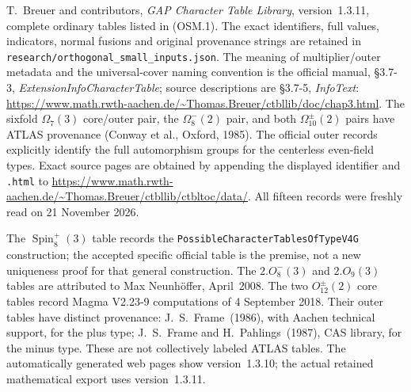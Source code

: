 T.~Breuer and contributors, \emph{GAP Character Table Library},
version~1.3.11, complete ordinary tables listed in (OSM.1).
The exact identifiers, full values, indicators, normal fusions and
original provenance strings are retained in
\texttt{research/orthogonal\_small\_inputs.json}.
The meaning of multiplier/outer metadata and the universal-cover
naming convention is the official manual, \S3.7-3,
\emph{ExtensionInfoCharacterTable}; source descriptions are \S3.7-5,
\emph{InfoText}:
\url{https://www.math.rwth-aachen.de/~Thomas.Breuer/ctbllib/doc/chap3.html}.
The sixfold $\Omega_7(3)$ core/outer pair, the $\Omega_8^-(2)$ pair,
and both $\Omega_{10}^{\pm}(2)$ pairs have ATLAS provenance
(Conway et al., Oxford, 1985). The official outer records explicitly
identify the full automorphism groups for the centerless even-field
types. Exact source pages are obtained by appending the displayed
identifier and \texttt{.html} to
\url{https://www.math.rwth-aachen.de/~Thomas.Breuer/ctbllib/ctbltoc/data/}.
All fifteen records were freshly read on 21 November 2026.

The $\operatorname{Spin}_8^+(3)$ table records the
\texttt{PossibleCharacterTablesOfTypeV4G} construction; the accepted
specific official table is the premise, not a new uniqueness proof
for that general construction. The $2.O_8^-(3)$ and $2.O_9(3)$
tables are attributed to Max Neunh\"offer, April~2008.
The two $O_{12}^{\pm}(2)$ core tables record Magma V2.23-9
computations of 4 September 2018. Their outer tables have distinct
provenance: J.~S.~Frame~(1986), with Aachen technical support,
for the plus type; J.~S.~Frame and H.~Pahlings~(1987), CAS library,
for the minus type. These are not collectively labeled ATLAS tables.
The automatically generated web pages show version~1.3.10;
the actual retained mathematical export uses version~1.3.11.
